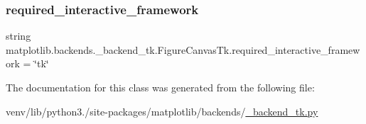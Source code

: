 \subsubsection{\texorpdfstring{required\+\_\+interactive\+\_\+framework}{required\_interactive\_framework}}
{\footnotesize\ttfamily string matplotlib.\+backends.\+\_\+backend\+\_\+tk.\+Figure\+Canvas\+Tk.\+required\+\_\+interactive\+\_\+framework = \char`\"{}tk\char`\"{}\hspace{0.3cm}{\ttfamily [static]}}



The documentation for this class was generated from the following file\+:\begin{DoxyCompactItemize}
\item 
venv/lib/python3./site-\/packages/matplotlib/backends/\hyperlink{__backend__tk_8py}{\+\_\+backend\+\_\+tk.\+py}\end{DoxyCompactItemize}
